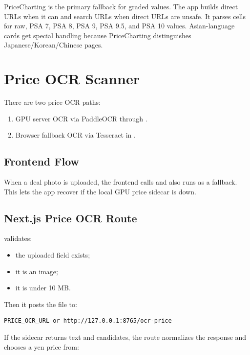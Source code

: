 \documentclass[11pt,a4paper]{article}
\begin{document}
PriceCharting is the primary fallback for graded values. The app builds direct URLs when it can and search URLs when direct URLs are unsafe. It parses cells for raw, PSA 7, PSA 8, PSA 9, PSA 9.5, and PSA 10 values. Asian-language cards get special handling because PriceCharting distinguishes Japanese/Korean/Chinese pages.

\section{Price OCR Scanner}

There are two price OCR paths:

\begin{enumerate}
  \item GPU server OCR via PaddleOCR through .
  \item Browser fallback OCR via Tesseract in .
\end{enumerate}

\subsection{Frontend Flow}

When a deal photo is uploaded, the frontend calls  and also runs  as a fallback. This lets the app recover if the local GPU price sidecar is down.

\subsection{Next.js Price OCR Route}

 validates:

\begin{itemize}
  \item the uploaded field exists;
  \item it is an image;
  \item it is under 10 MB.
\end{itemize}

Then it posts the file to:

\begin{lstlisting}
PRICE_OCR_URL or http://127.0.0.1:8765/ocr-price
\end{lstlisting}

If the sidecar returns text and candidates, the route normalizes the response and chooses a yen price from:
\end{document}
